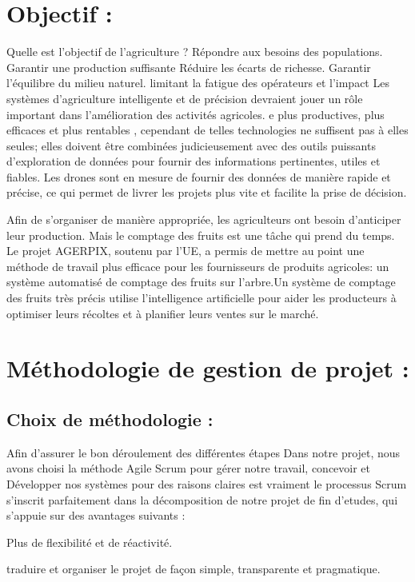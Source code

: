 \documentclass[a4paper,12pt]{report}
\begin{document}
	\section{Objectif :}
	Quelle est l'objectif de l'agriculture ?
	Répondre aux besoins des populations. Garantir une production suffisante Réduire les écarts de richesse. Garantir l'équilibre du milieu naturel.  limitant la fatigue des opérateurs et l’impact
	Les systèmes d’agriculture intelligente et de précision devraient jouer un rôle important dans
	l’amélioration des activités agricoles.
	e plus productives, plus efficaces
	et plus rentables
	, cependant de telles technologies ne suffisent pas à elles seules; elles doivent être
	combinées judicieusement avec des outils puissants d’exploration de données pour fournir des informations pertinentes, utiles et fiables.
	Les drones sont en mesure de fournir des données de manière rapide et précise, ce qui permet de livrer les projets plus vite et facilite la prise de décision.
	
	
	
	Afin de s’organiser de manière appropriée, les agriculteurs ont besoin d’anticiper leur production. Mais le comptage des fruits est une tâche qui prend du temps. Le projet AGERPIX, soutenu par l’UE, a permis de mettre au point une méthode de travail plus efficace pour les fournisseurs de produits agricoles: un système automatisé de comptage des fruits sur l’arbre.Un système de comptage des fruits très précis utilise l’intelligence artificielle pour aider les producteurs à optimiser leurs récoltes et à planifier leurs ventes sur le marché.
	
	\section{Méthodologie de gestion de projet :}
	\subsection{Choix de méthodologie :}
	Afin d'assurer le bon déroulement des différentes étapes
	Dans notre projet, nous avons choisi la méthode Agile Scrum pour gérer notre travail, concevoir et
	Développer nos systèmes pour des raisons claires est vraiment le processus
	Scrum s'inscrit parfaitement dans la décomposition de notre projet de fin d'etudes, qui s'appuie sur des avantages suivants :
	\par
	Plus de flexibilité et de réactivité.
	\par
	traduire et organiser le projet de façon simple, transparente et pragmatique.
	
\end{document}

